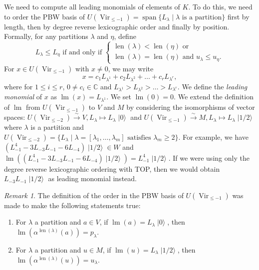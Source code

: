 \documentclass[a4paper, 12pt, reqno]{amsart}
\theoremstyle{remark}
\newtheorem{remark}[theorem]{Remark}
\DeclareMathOperator{\Vir}{Vir}
\DeclareMathOperator{\lm}{lm}
\DeclareMathOperator{\vspan}{span}
\DeclareMathOperator{\len}{len}
\DeclareMathOperator{\vac}{|0\rangle}
\DeclareMathOperator{\vachalf}{|1/2\rangle}
\begin{document}
We need to compute all leading monomials of elements of $K$.
To do this, we need to order the PBW basis of $U(\Vir_{\le -1}) = \vspan\{L_{\lambda} \mid \lambda\text{ is a partition}\}$ first by length, then by degree reverse lexicographic order and finally by position.
Formally, for any partitions $\lambda$ and $\eta$, define
\begin{equation*}
  L_{\lambda} \le L_{\eta}\text{ if and only if }
  \begin{cases}
    \len(\lambda) < \len(\eta)\text{ or } \\
    \len(\lambda) = \len(\eta)\text{ and }u_{\lambda} \le u_{\eta}.
  \end{cases}
\end{equation*}
For $x \in U(\Vir_{\le -1})$ with $x \neq 0$, we may write
\begin{equation*}
  x = c_1L_{\lambda^1} + c_2L_{\lambda^2} + \dots + c_rL_{\lambda^r},
\end{equation*}
where for $1 \le i\le r$, $0 \neq c_i \in \mathbb{C}$ and $L_{\lambda^1} > L_{\lambda^2} > \dots > L_{\lambda^r}$.
We define the \emph{leading monomial} of $x$ as $\lm(x) = L_{\lambda^1}$.
We set $\lm(0) = 0$.
We extend the definition of $\lm$ from $U(\Vir_{\le -1})$ to $V$ and $M$ by considering the isomorphisms of vector spaces: $U(\Vir_{\le -2}) \xrightarrow{\sim} V, L_{\lambda} \mapsto L_{\lambda}\vac$ and $U(\Vir_{\le -1}) \xrightarrow{\sim} M, L_{\lambda} \mapsto L_{\lambda}\vachalf$ where $\lambda$ is a partition and $U(\Vir_{\le -2}) = \{L_{\lambda} \mid \lambda = [\lambda_1, \dots, \lambda_m]\text{ satisfies }\lambda_m \ge 2\}$.
For example, we have $(L_{-1}^4 - 3L_{-3}L_{-1} - 6L_{-4})\vachalf \in W$ and $\lm((L_{-1}^4 - 3L_{-3}L_{-1} - 6L_{-4})\vachalf) = L_{-1}^4\vachalf$.
If we were using only the degree reverse lexicographic ordering with TOP, then we would obtain $L_{-3}L_{-1}\vachalf$ as leading monomial instead.

\begin{remark}
  \label{rmk:3}
  The definition of the order in the PBW basis of $U(\Vir_{\le -1})$ was made to make the following statements true:
  \begin{enumerate}
  \item For $\lambda$ a partition and $a \in V$, if $\lm(a) = L_{\lambda}\vac$, then $\lm(\alpha^{\len(\lambda)}(a)) = p_{\lambda}$.
  \item For $\lambda$ a partition and $u \in M$, if $\lm(u) = L_{\lambda}\vachalf$, then $\lm(\alpha^{\len(\lambda)}(u)) = u_{\lambda}$.
  \end{enumerate}
\end{remark}
\end{document}
